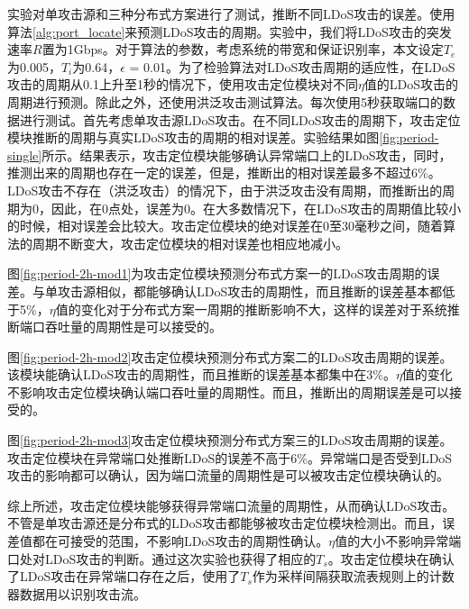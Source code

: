 实验对单攻击源和三种分布式方案进行了测试，推断不同LDoS攻击的误差。使用算法\ref{alg:port_locate}来预测LDoS攻击的周期。实验中，我们将LDoS攻击的突发速率$R$置为1Gbps。对于算法的参数，考虑系统的带宽和保证识别率，本文设定$T_e$为0.005，$T_i$为0.64，$\epsilon$ = 0.01。为了检验算法对LDoS攻击周期的适应性，在LDoS攻击的周期从0.1上升至1秒的情况下，使用攻击定位模块对不同$\eta$值的LDoS攻击的周期进行预测。除此之外，还使用洪泛攻击测试算法。每次使用5秒获取端口的数据进行测试。首先考虑单攻击源LDoS攻击。在不同LDoS攻击的周期下，攻击定位模块推断的周期与真实LDoS攻击的周期的相对误差。实验结果如图\ref{fig:period-single}所示。结果表示，攻击定位模块能够确认异常端口上的LDoS攻击，同时，推测出来的周期也存在一定的误差，但是，推断出的相对误差最多不超过6\%。LDoS攻击不存在（洪泛攻击）的情况下，由于洪泛攻击没有周期，而推断出的周期为0，因此，在0点处，误差为0。在大多数情况下，在LDoS攻击的周期值比较小的时候，相对误差会比较大。攻击定位模块的绝对误差在0至30毫秒之间，随着算法的周期不断变大，攻击定位模块的相对误差也相应地减小。

图\ref{fig:period-2h-mod1}为攻击定位模块预测分布式方案一的LDoS攻击周期的误差。与单攻击源相似，都能够确认LDoS攻击的周期性，而且推断的误差基本都低于5\%，$\eta$值的变化对于分布式方案一周期的推断影响不大，这样的误差对于系统推断端口吞吐量的周期性是可以接受的。

图\ref{fig:period-2h-mod2}攻击定位模块预测分布式方案二的LDoS攻击周期的误差。该模块能确认LDoS攻击的周期性，而且推断的误差基本都集中在3\%。$\eta$值的变化不影响攻击定位模块确认端口吞吐量的周期性。而且，推断出的周期误差是可以接受的。

图\ref{fig:period-2h-mod3}攻击定位模块预测分布式方案三的LDoS攻击周期的误差。攻击定位模块在异常端口处推断LDoS的误差不高于6\%。异常端口是否受到LDoS攻击的影响都可以确认，因为端口流量的周期性是可以被攻击定位模块确认的。

综上所述，攻击定位模块能够获得异常端口流量的周期性，从而确认LDoS攻击。不管是单攻击源还是分布式的LDoS攻击都能够被攻击定位模块检测出。而且，误差值都在可接受的范围，不影响LDoS攻击的周期性确认。$\eta$值的大小不影响异常端口处对LDoS攻击的判断。通过这次实验也获得了相应的$T_s$。攻击定位模块在确认了LDoS攻击在异常端口存在之后，使用了$T_s$作为采样间隔获取流表规则上的计数器数据用以识别攻击流。

